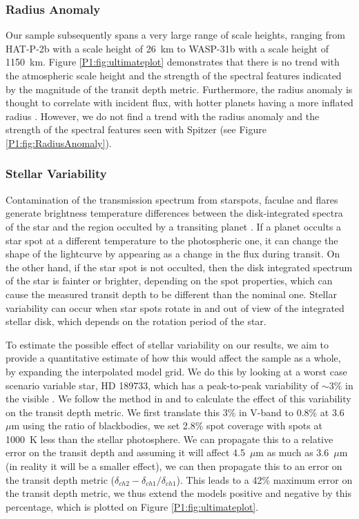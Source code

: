 \subsubsection{Radius Anomaly}

Our sample subsequently spans a very large range of scale heights, ranging from HAT-P-2b with a scale height of 26~km to WASP-31b with a scale height of 1150~km. Figure \ref{P1:fig:ultimateplot} demonstrates that there is no trend with the atmospheric scale height and the strength of the spectral features indicated by the magnitude of the transit depth metric. Furthermore, the radius anomaly is thought to correlate with incident flux, with hotter planets having a more inflated radius \citep{Thorngren2018}. However, we do not find a trend with the radius anomaly and the strength of the spectral features seen with Spitzer (see Figure \ref{P1:fig:RadiusAnomaly}).

\subsubsection{Stellar Variability}
\label{P1:sec:stellarVariabilitiy}

Contamination of the transmission spectrum from starspots, faculae and flares generate brightness temperature differences between the disk-integrated spectra of the star and the region occulted by a transiting planet \citep{Desert2011d, Pont2008, Sing2011}. If a planet occults a star spot at a different temperature to the photospheric one, it can change the shape of the lightcurve by appearing as a change in the flux during transit. On the other hand, if the star spot is not occulted, then the disk integrated spectrum of the star is  fainter or brighter, depending on the spot properties, which can cause the measured transit depth to be different than the nominal one. Stellar variability can occur when star spots rotate in and out of view of the integrated stellar disk, which depends on the rotation period of the star.

To estimate the possible effect of stellar variability on our results, we aim to provide a quantitative estimate of how this would affect the sample as a whole, by expanding the interpolated model grid. We do this by looking at a worst case scenario variable star, HD 189733, which has a peak-to-peak variability of $\sim 3$\% in the visible \citep{Henry2008}. We follow the method in \citet{Desert2011d, Sing2011} and \citet{Berta2012} to calculate the effect of this variability on the transit depth metric. We first translate this 3\% in V-band to 0.8\% at 3.6~$\mu$m using the ratio of blackbodies, we set 2.8\% spot coverage with spots at 1000~K less than the stellar photosphere. We can propagate this to a relative error on the transit depth and assuming it will affect 4.5~$\mu$m as much as 3.6~$\mu$m (in reality it will be a smaller effect), we can then propagate this to an error on the transit depth metric ($\delta_{ch2} - \delta_{ch1} / \delta_{ch1}$). This leads to a 42\% maximum error on the transit depth metric, we thus extend the models positive and negative by this percentage, which is plotted on Figure \ref{P1:fig:ultimateplot}.


